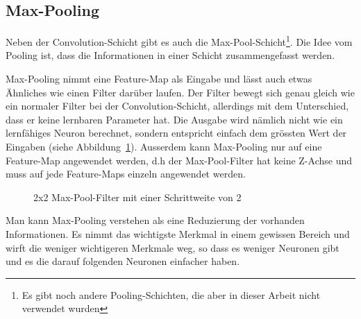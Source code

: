 \documentclass[12pt,a4paper]{report}
\begin{document}
\subsection{Max-Pooling}
Neben der Convolution-Schicht gibt es auch die Max-Pool-Schicht\footnote{Es gibt noch andere Pooling-Schichten, die aber in dieser Arbeit nicht verwendet wurden}.
Die Idee vom Pooling ist, dass die Informationen in einer Schicht zusammengefasst werden.

Max-Pooling nimmt eine Feature-Map als Eingabe und lässt auch etwas Ähnliches wie einen Filter darüber laufen.
Der Filter bewegt sich genau gleich wie ein normaler Filter bei der Convolution-Schicht, allerdings mit dem Unterschied, dass er keine lernbaren Parameter hat.
Die Ausgabe wird nämlich nicht wie ein lernfähiges Neuron berechnet, sondern entspricht einfach dem grössten Wert der Eingaben (siehe Abbildung~\ref{fig:pool1}).
Ausserdem kann Max-Pooling nur auf eine Feature-Map angewendet werden,
d.h der Max-Pool-Filter hat keine Z-Achse und muss auf jede Feature-Maps einzeln angewendet werden\cite{conv}.
\begin{figure}[!h]
    \centering
    \caption{2x2 Max-Pool-Filter mit einer Schrittweite von 2}
    \label{fig:pool1}
\end{figure}
Man kann Max-Pooling verstehen als eine Reduzierung der vorhanden Informationen.
Es nimmt das wichtigste Merkmal in einem gewissen Bereich und wirft die weniger wichtigeren Merkmale weg,
so dass es weniger Neuronen gibt und es die darauf folgenden Neuronen einfacher haben.
\end{document}
